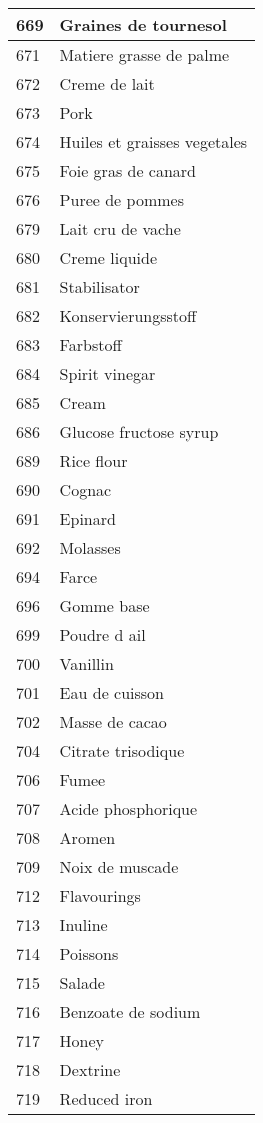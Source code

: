 \begin{longtable}{|l|l|}
669 & Graines de tournesol \\ \hline 
671 & Matiere grasse de palme \\ \hline 
672 & Creme de lait \\ \hline 
673 & Pork \\ \hline 
674 & Huiles et graisses vegetales \\ \hline 
675 & Foie gras de canard \\ \hline 
676 & Puree de pommes \\ \hline 
679 & Lait cru de vache \\ \hline 
680 & Creme liquide \\ \hline 
681 & Stabilisator \\ \hline 
682 & Konservierungsstoff \\ \hline 
683 & Farbstoff \\ \hline 
684 & Spirit vinegar \\ \hline 
685 & Cream \\ \hline 
686 & Glucose fructose syrup \\ \hline 
689 & Rice flour \\ \hline 
690 & Cognac \\ \hline 
691 & Epinard \\ \hline 
692 & Molasses \\ \hline 
694 & Farce \\ \hline 
696 & Gomme base \\ \hline 
699 & Poudre d ail \\ \hline 
700 & Vanillin \\ \hline 
701 & Eau de cuisson \\ \hline 
702 & Masse de cacao \\ \hline 
704 & Citrate trisodique \\ \hline 
706 & Fumee \\ \hline 
707 & Acide phosphorique \\ \hline 
708 & Aromen \\ \hline 
709 & Noix de muscade \\ \hline 
712 & Flavourings \\ \hline 
713 & Inuline \\ \hline 
714 & Poissons \\ \hline 
715 & Salade \\ \hline 
716 & Benzoate de sodium \\ \hline 
717 & Honey \\ \hline 
718 & Dextrine \\ \hline 
719 & Reduced iron \\ \hline 

\end{longtable}
